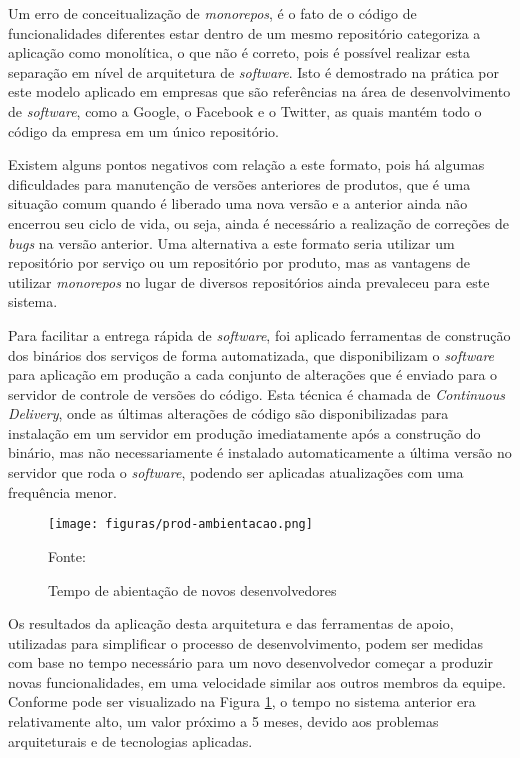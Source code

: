 Um erro de conceitualização de \emph{monorepos}, é o fato de o código de
funcionalidades diferentes estar dentro de um mesmo repositório categoriza
a aplicação como monolítica, o que não é correto, pois é possível
realizar esta separação em nível de arquitetura de \emph{software}. Isto é
demostrado na prática por este modelo aplicado em empresas que são
referências na área de desenvolvimento de \emph{software}, como a Google,
o Facebook e o Twitter, as quais mantém todo o código da empresa em um
único repositório.

Existem alguns pontos negativos com relação a este formato, pois há
algumas dificuldades para manutenção de versões anteriores de produtos,
que é uma situação comum quando é liberado uma nova versão e a anterior
ainda não encerrou seu ciclo de vida, ou seja, ainda é necessário a
realização de correções de \emph{bugs} na versão anterior. Uma alternativa
a este formato seria utilizar um repositório por serviço ou um repositório
por produto, mas as vantagens de utilizar \emph{monorepos} no lugar de
diversos repositórios ainda prevaleceu para este sistema.

Para facilitar a entrega rápida de \emph{software}, foi aplicado ferramentas de
construção dos binários dos serviços de forma automatizada, que disponibilizam
o \emph{software} para aplicação em produção a cada conjunto de alterações que é
enviado para o servidor de controle de versões do código. Esta técnica é
chamada de \emph{Continuous Delivery}, onde as últimas alterações de código
são disponibilizadas para instalação em um servidor em produção imediatamente
após a construção do binário, mas não necessariamente é instalado
automaticamente a última versão no servidor que roda o \emph{software},
podendo ser aplicadas atualizações com uma frequência menor.

\begin{figure}[H]
	\centering
	\caption{Tempo de abientação de novos desenvolvedores}
	\texttt{[image: figuras/prod-ambientacao.png]}

	\label{fig:prod-ambientacao}
	\footnotesize Fonte: \fonteOAutor
\end{figure}

Os resultados da aplicação desta arquitetura e das ferramentas de apoio,
utilizadas para simplificar o processo de desenvolvimento, podem ser
medidas com base no tempo necessário para um novo desenvolvedor começar
a produzir novas funcionalidades, em uma velocidade similar aos outros
membros da equipe. Conforme pode ser visualizado na Figura
\ref{fig:prod-ambientacao}, o tempo no sistema anterior era relativamente
alto, um valor próximo a 5 meses, devido aos problemas arquiteturais e de
tecnologias aplicadas.

